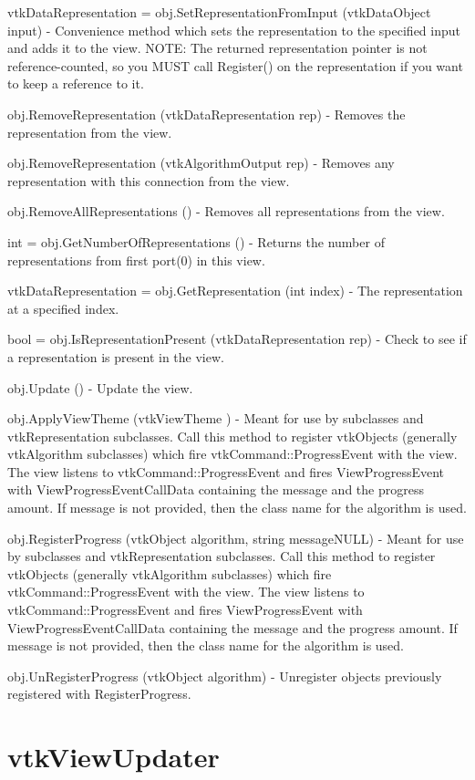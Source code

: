 \begin{DoxyItemize}
\item {\ttfamily vtk\-Data\-Representation = obj.\-Set\-Representation\-From\-Input (vtk\-Data\-Object input)} -\/ Convenience method which sets the representation to the specified input and adds it to the view. N\-O\-T\-E\-: The returned representation pointer is not reference-\/counted, so you M\-U\-S\-T call Register() on the representation if you want to keep a reference to it.  
\item {\ttfamily obj.\-Remove\-Representation (vtk\-Data\-Representation rep)} -\/ Removes the representation from the view.  
\item {\ttfamily obj.\-Remove\-Representation (vtk\-Algorithm\-Output rep)} -\/ Removes any representation with this connection from the view.  
\item {\ttfamily obj.\-Remove\-All\-Representations ()} -\/ Removes all representations from the view.  
\item {\ttfamily int = obj.\-Get\-Number\-Of\-Representations ()} -\/ Returns the number of representations from first port(0) in this view.  
\item {\ttfamily vtk\-Data\-Representation = obj.\-Get\-Representation (int index)} -\/ The representation at a specified index.  
\item {\ttfamily bool = obj.\-Is\-Representation\-Present (vtk\-Data\-Representation rep)} -\/ Check to see if a representation is present in the view.  
\item {\ttfamily obj.\-Update ()} -\/ Update the view.  
\item {\ttfamily obj.\-Apply\-View\-Theme (vtk\-View\-Theme )} -\/ Meant for use by subclasses and vtk\-Representation subclasses. Call this method to register vtk\-Objects (generally vtk\-Algorithm subclasses) which fire vtk\-Command\-::\-Progress\-Event with the view. The view listens to vtk\-Command\-::\-Progress\-Event and fires View\-Progress\-Event with View\-Progress\-Event\-Call\-Data containing the message and the progress amount. If message is not provided, then the class name for the algorithm is used.  
\item {\ttfamily obj.\-Register\-Progress (vtk\-Object algorithm, string message\-N\-U\-L\-L)} -\/ Meant for use by subclasses and vtk\-Representation subclasses. Call this method to register vtk\-Objects (generally vtk\-Algorithm subclasses) which fire vtk\-Command\-::\-Progress\-Event with the view. The view listens to vtk\-Command\-::\-Progress\-Event and fires View\-Progress\-Event with View\-Progress\-Event\-Call\-Data containing the message and the progress amount. If message is not provided, then the class name for the algorithm is used.  
\item {\ttfamily obj.\-Un\-Register\-Progress (vtk\-Object algorithm)} -\/ Unregister objects previously registered with Register\-Progress.  
\end{DoxyItemize}\hypertarget{vtkviews_vtkviewupdater}{}\section{vtk\-View\-Updater}\label{vtkviews_vtkviewupdater}
